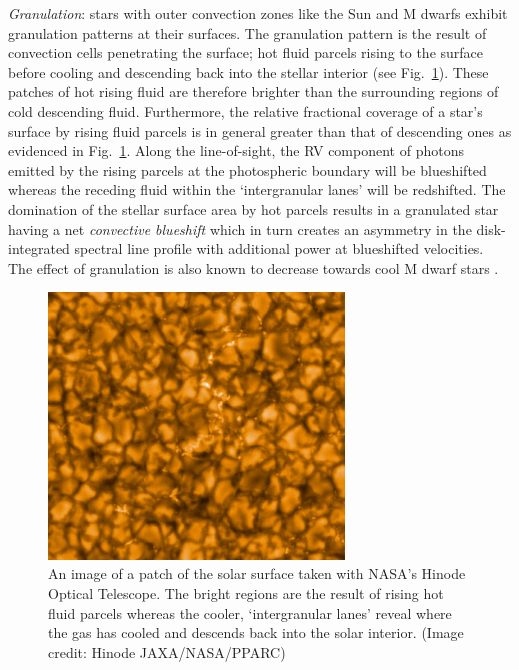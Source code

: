 \emph{Granulation}:
stars with outer convection zones like the Sun and M dwarfs exhibit granulation patterns
at their surfaces. The granulation pattern is the result
of convection cells penetrating the surface; hot fluid parcels rising to the surface before
cooling and descending back into the stellar interior (see Fig.~\ref{fig:granulation}).
These patches of hot rising fluid are therefore brighter than the surrounding regions of cold
descending fluid. Furthermore, the relative fractional coverage of a star's surface by rising
fluid parcels is in general greater than that of descending ones as evidenced in
Fig.~\ref{fig:granulation}.
Along the line-of-sight, the RV component of photons emitted by the rising parcels at the
photospheric boundary will be blueshifted whereas the receding fluid within the
`intergranular lanes' will be redshifted. The domination of the stellar
surface area by hot parcels results in a granulated star having a net \emph{convective
  blueshift} which in turn creates an asymmetry in the disk-integrated spectral line profile
with additional power at blueshifted velocities. The effect of granulation is also known
to decrease towards cool M dwarf stars \citep{dumusque11a,meunier17}. \\

\begin{figure}
  \centering
  \includegraphics[width=0.7\textwidth]{figures/solargranulation.jpg}
  \caption[Close-in view of the convection cells on the solar surface.]
      {An image of a patch of the solar surface taken with NASA's Hinode Optical
    Telescope. The bright regions are the result of rising hot fluid parcels whereas the cooler,
    `intergranular lanes' reveal where the gas has cooled and descends back into the solar
    interior. (Image credit: Hinode JAXA/NASA/PPARC)}
  \label{fig:granulation}
\end{figure}


